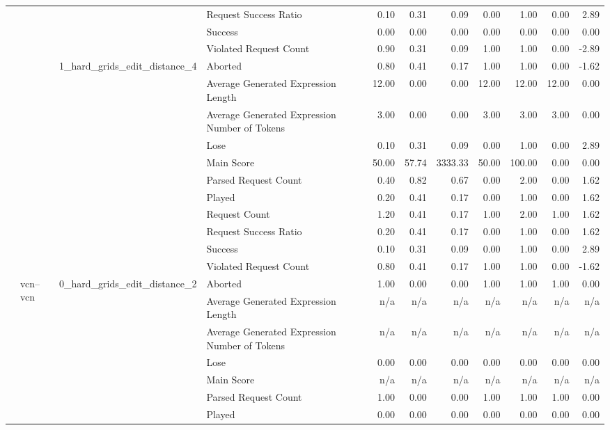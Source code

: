 \begin{tabular}{llllrrrrrrr}
 &  &  & Request Success Ratio & 0.10 & 0.31 & 0.09 & 0.00 & 1.00 & 0.00 & 2.89 \\
 &  &  & Success & 0.00 & 0.00 & 0.00 & 0.00 & 0.00 & 0.00 & 0.00 \\
 &  &  & Violated Request Count & 0.90 & 0.31 & 0.09 & 1.00 & 1.00 & 0.00 & -2.89 \\
\cline{3-11}
 &  & \multirow[t]{11}{*}{1_hard_grids_edit_distance_4} & Aborted & 0.80 & 0.41 & 0.17 & 1.00 & 1.00 & 0.00 & -1.62 \\
 &  &  & Average Generated Expression Length & 12.00 & 0.00 & 0.00 & 12.00 & 12.00 & 12.00 & 0.00 \\
 &  &  & Average Generated Expression Number of Tokens & 3.00 & 0.00 & 0.00 & 3.00 & 3.00 & 3.00 & 0.00 \\
 &  &  & Lose & 0.10 & 0.31 & 0.09 & 0.00 & 1.00 & 0.00 & 2.89 \\
 &  &  & Main Score & 50.00 & 57.74 & 3333.33 & 50.00 & 100.00 & 0.00 & 0.00 \\
 &  &  & Parsed Request Count & 0.40 & 0.82 & 0.67 & 0.00 & 2.00 & 0.00 & 1.62 \\
 &  &  & Played & 0.20 & 0.41 & 0.17 & 0.00 & 1.00 & 0.00 & 1.62 \\
 &  &  & Request Count & 1.20 & 0.41 & 0.17 & 1.00 & 2.00 & 1.00 & 1.62 \\
 &  &  & Request Success Ratio & 0.20 & 0.41 & 0.17 & 0.00 & 1.00 & 0.00 & 1.62 \\
 &  &  & Success & 0.10 & 0.31 & 0.09 & 0.00 & 1.00 & 0.00 & 2.89 \\
 &  &  & Violated Request Count & 0.80 & 0.41 & 0.17 & 1.00 & 1.00 & 0.00 & -1.62 \\
\cline{2-11} \cline{3-11}
 & \multirow[t]{22}{*}{vcn--vcn} & \multirow[t]{11}{*}{0_hard_grids_edit_distance_2} & Aborted & 1.00 & 0.00 & 0.00 & 1.00 & 1.00 & 1.00 & 0.00 \\
 &  &  & Average Generated Expression Length & n/a & n/a & n/a & n/a & n/a & n/a & n/a \\
 &  &  & Average Generated Expression Number of Tokens & n/a & n/a & n/a & n/a & n/a & n/a & n/a \\
 &  &  & Lose & 0.00 & 0.00 & 0.00 & 0.00 & 0.00 & 0.00 & 0.00 \\
 &  &  & Main Score & n/a & n/a & n/a & n/a & n/a & n/a & n/a \\
 &  &  & Parsed Request Count & 1.00 & 0.00 & 0.00 & 1.00 & 1.00 & 1.00 & 0.00 \\
 &  &  & Played & 0.00 & 0.00 & 0.00 & 0.00 & 0.00 & 0.00 & 0.00 \\

\end{tabular}
